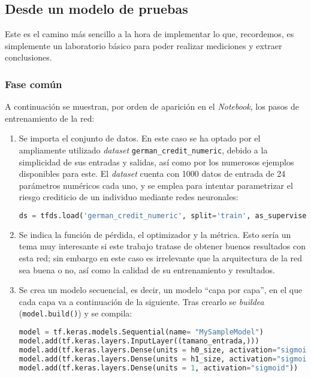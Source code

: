 \subsection{Desde un modelo de pruebas}
\label{ssec:desde_modelo_de_pruebas}
Este es el camino más sencillo a la hora de implementar lo que, recordemos, es simplemente un laboratorio básico para poder realizar mediciones y extraer conclusiones.

\subsubsection{Fase común}
\label{sssec:modelo_pruebas_fase_comun}
A continuación se muestran, por orden de aparición en el \textit{Notebook}, los pasos de entrenamiento de la red:

\begin{enumerate}
    \item Se importa el conjunto de datos. En este caso se ha optado por el ampliamente utilizado \textit{dataset} \texttt{german\_credit\_numeric}, debido a la simplicidad de sus entradas y salidas, así como por los numerosos ejemplos disponibles para este. El \textit{dataset} cuenta con 1000 datos de entrada de 24 parámetros numéricos cada uno, y se emplea para intentar parametrizar el riesgo crediticio de un individuo mediante redes neuronales:\medskip
\begin{lstlisting}[language=Python]
ds = tfds.load('german_credit_numeric', split='train', as_supervised=True)
\end{lstlisting}

    \item Se indica la función de pérdida, el optimizador y la métrica. Esto sería un tema muy interesante si este trabajo tratase de obtener buenos resultados con esta red; sin embargo en este caso es irrelevante que la arquitectura de la red sea buena o no, así como la calidad de su entrenamiento y resultados.

    \item Se crea un modelo secuencial, es decir, un modelo ``capa por capa'', en el que cada capa va a continuación de la siguiente. Tras crearlo se \textit{buildea} (\texttt{model.build()}) y se compila:\medskip
\begin{lstlisting}[language=Python]
model = tf.keras.models.Sequential(name= "MySampleModel")
model.add(tf.keras.layers.InputLayer((tamano_entrada,)))
model.add(tf.keras.layers.Dense(units = h0_size, activation="sigmoid"))
model.add(tf.keras.layers.Dense(units = h1_size, activation="sigmoid"))
model.add(tf.keras.layers.Dense(units = 1, activation="sigmoid"))


\end{lstlisting}
\end{enumerate}
